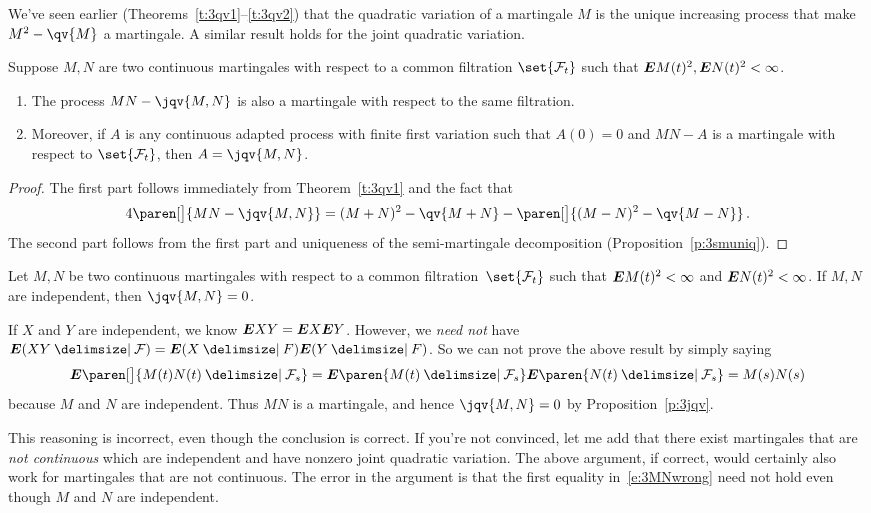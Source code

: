 We've seen earlier (Theorems~\ref{t:3qv1}--\ref{t:3qv2}) that the quadratic variation of a martingale $M$ is the unique increasing process that make $M^2 - \qv{M}$ a martingale.
A similar result holds for the joint quadratic variation.
\begin{proposition}\label{p:3jqv}
  Suppose $M, N$ are two continuous martingales with respect to a common filtration $\set{\mathcal F_t}$ such that $\bm{E} M(t)^2, \bm{E} N(t)^2 < \infty$.
  \begin{enumerate}
    \item
      The process $MN - \jqv{M,N}$ is also a martingale with respect to the same filtration.
    \item
      Moreover, if $A$ is any continuous adapted process with finite first variation such that $A(0) = 0$ and $MN - A$ is a martingale with respect to $\set{\mathcal F_t}$, then $A = \jqv{M,N}$.
  \end{enumerate}
\end{proposition}
\begin{proof}
  The first part follows immediately from Theorem~\ref{t:3qv1} and the fact that
  \begin{equation*}
    4 \paren[\big]{ MN - \jqv{M,N} }
      = (M+N)^2 - \qv{M+N} - \paren[\big]{(M-N)^2 - \qv{M-N}}\,.
  \end{equation*}
  The second part follows from the first part and uniqueness of the semi-martingale decomposition (Proposition~\ref{p:3smuniq}).
\end{proof}
\begin{proposition}
  Let $M, N$ be two continuous martingales with respect to a common filtration~$\set{\mathcal F_t}$ such that $\bm{E} M(t)^2 < \infty$ and $\bm{E} N(t)^2 < \infty$.
  If $M,N$ are independent, then $\jqv{M,N} = 0$.
\end{proposition}
\begin{remark}
  If $X$ and $Y$ are independent, we know $\bm{E} XY = \bm{E} X \bm{E} Y$.
  However, we \emph{need not} have $\E (XY \given \mathcal F) = \E(X \given F) \E (Y \given F)$.
  So we can not prove the above result by simply saying
  \begin{equation}\label{e:3MNwrong}
    \E \paren[\big]{ M(t) N(t) \given \mathcal F_s }
      = \E \paren{ M(t) \given \mathcal F_s }
	  \E \paren{ N(t) \given \mathcal F_s }
      = M(s) N(s)
  \end{equation}
  because $M$ and $N$ are independent.
  Thus  $MN$ is a martingale, and hence $\jqv{M,N} = 0$ by Proposition~\ref{p:3jqv}.

  This reasoning is incorrect, even though the conclusion is correct.
  If you're not convinced, let me add that there exist martingales that are \emph{not continuous} which are independent and have nonzero joint quadratic variation.
  The above argument, if correct, would certainly also work for martingales that are not continuous.
  The error in the argument is that the first equality in~\eqref{e:3MNwrong} need not hold even though $M$ and $N$ are independent.
\end{remark}
